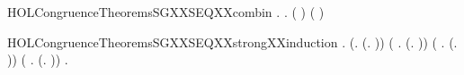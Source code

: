 \newcommand{\HOLCongruenceTheoremsSGXXrules}{\UseVerbatim{HOLCongruenceTheoremsSGXXrules}}
\begin{SaveVerbatim}{HOLCongruenceTheoremsSGXXSEQXXcombin}
\HOLTokenTurnstile{} \HOLSymConst{\HOLTokenForall{}}.   \HOLSymConst{\HOLTokenConj{}}   \HOLSymConst{\HOLTokenImp{}} \HOLSymConst{\HOLTokenForall{}}.   \HOLSymConst{\HOLTokenImp{}}  ( \HOLConst{\HOLTokenCompose} ) \HOLSymConst{\HOLTokenConj{}}  ( \HOLConst{\HOLTokenCompose} )
\end{SaveVerbatim}
\newcommand{\HOLCongruenceTheoremsSGXXSEQXXcombin}{\UseVerbatim{HOLCongruenceTheoremsSGXXSEQXXcombin}}
\begin{SaveVerbatim}{HOLCongruenceTheoremsSGXXSEQXXstrongXXinduction}
\HOLTokenTurnstile{} \HOLSymConst{\HOLTokenForall{}}.
       (\HOLSymConst{\HOLTokenForall{}}.  (\HOLTokenLambda{}. )) \HOLSymConst{\HOLTokenConj{}} (\HOLSymConst{\HOLTokenForall{}} .   \HOLSymConst{\HOLTokenImp{}}  (\HOLTokenLambda{}.   )) \HOLSymConst{\HOLTokenConj{}}
       (\HOLSymConst{\HOLTokenForall{}} .   \HOLSymConst{\HOLTokenConj{}}   \HOLSymConst{\HOLTokenConj{}}   \HOLSymConst{\HOLTokenImp{}}  (\HOLTokenLambda{}.  )) \HOLSymConst{\HOLTokenConj{}}
       (\HOLSymConst{\HOLTokenForall{}} .
              \HOLSymConst{\HOLTokenConj{}}   \HOLSymConst{\HOLTokenConj{}}   \HOLSymConst{\HOLTokenConj{}}   \HOLSymConst{\HOLTokenConj{}}   \HOLSymConst{\HOLTokenConj{}}   \HOLSymConst{\HOLTokenImp{}}
             (\HOLTokenLambda{}.   \HOLSymConst{\ensuremath{+}}  )) \HOLSymConst{\HOLTokenImp{}}
       \HOLSymConst{\HOLTokenForall{}}.   \HOLSymConst{\HOLTokenConj{}}   \HOLSymConst{\HOLTokenImp{}}  
\end{SaveVerbatim}
